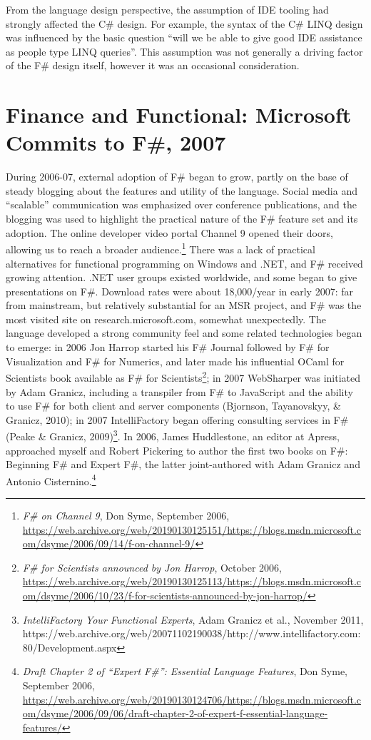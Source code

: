 \documentclass[acmsmall]{acmart}\settopmatter{}
\begin{document}
From the language design perspective, the assumption of IDE tooling had strongly affected the C\# design.  For
example, the syntax of the C\# LINQ design was influenced by the basic question “will we be able to give good
IDE assistance as people type LINQ queries”.  This assumption was not generally a driving factor of the F\# design itself, however it was an occasional consideration.



\section*{Finance and Functional: Microsoft Commits to F\#, 2007}

During 2006-07, external adoption of F\# began to grow, partly on the base of steady blogging about the features and utility of the language.
Social media and “scalable” communication was emphasized over conference publications, and the blogging was used to highlight the practical
nature of the F\# feature set and its adoption. The online developer video portal Channel 9 opened their doors, allowing us to reach a broader
audience.\footnote{\textit{F\# on Channel 9}, Don Syme, September 2006, \url{https://web.archive.org/web/20190130125151/https://blogs.msdn.microsoft.com/dsyme/2006/09/14/f-on-channel-9/}}
There was a lack of practical alternatives for functional programming on Windows and .NET, and F\# received growing attention.
.NET user groups existed worldwide, and some began to give presentations on F\#. Download rates were about 18,000/year in early 2007:
far from mainstream, but relatively substantial for an MSR project, and F\# was the most visited site on research.microsoft.com, somewhat
unexpectedly. The language developed a strong community feel and some related technologies began to emerge: in 2006 Jon Harrop started
his F\# Journal followed by F\# for Visualization and F\# for Numerics, and later made his influential OCaml for Scientists book available
as F\# for Scientists\footnote{ \textit{F\# for Scientists announced by Jon Harrop}, October 2006, \url{https://web.archive.org/web/20190130125113/https://blogs.msdn.microsoft.com/dsyme/2006/10/23/f-for-scientists-announced-by-jon-harrop/}}; in 2007 WebSharper was initiated by Adam Granicz, including a
transpiler from F\# to JavaScript and the ability to use F\# for both client and server
components (Bjornson, Tayanovskyy, \& Granicz, 2010); in 2007 IntelliFactory began offering consulting services
in F\# (Peake \& Granicz, 2009)\footnote{\textit{IntelliFactory Your Functional Experts}, Adam Granicz et al., November 2011, https://web.archive.org/web/20071102190038/http://www.intellifactory.com:80/Development.aspx}.
In 2006, James Huddlestone, an editor at Apress, approached myself and Robert Pickering to author the first two
books on F\#: Beginning F\# and Expert F\#, the latter joint-authored with Adam Granicz and Antonio Cisternino.\footnote{\textit{Draft Chapter 2 of ``Expert F\#'': Essential Language Features}, Don Syme, September 2006, \url{https://web.archive.org/web/20190130124706/https://blogs.msdn.microsoft.com/dsyme/2006/09/06/draft-chapter-2-of-expert-f-essential-language-features/}}
\end{document}
